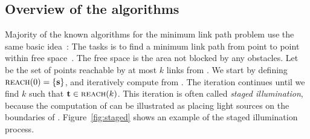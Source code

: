 \documentclass[english,gradu]{tktltiki2018}
\begin{document}
\subsection{Overview of the algorithms}\label{sec:overview}

Majority of the known algorithms for the minimum link path problem use the same basic idea~\cite[Sections 26.4, 27.3]{handbook}:
The tasks is to find a minimum link path from point \spt to point \ept within free space~\fspace.
The free space is the area not blocked by any obstacles.
Let  be the set of points reachable by at most $k$ links from \spt.
We start by defining $\textsc{reach}(0)=\left\{\textbf{s}\right\}$, and iteratively compute  from .
The iteration continues until we find $k$ such that $\textbf{t}\in\textsc{reach}(k)$.
This iteration is often called \emph{staged illumination}, because the computation of  can be illustrated as placing light sources on the boundaries of .
Figure~\ref{fig:staged} shows an example of the staged illumination process.
\end{document}
